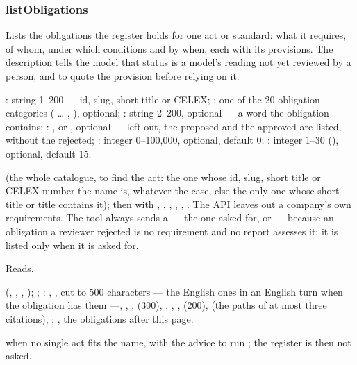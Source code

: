 \subsubsection{listObligations}\label{sec:tools:listObligations}
\begin{description}[style=multiline, leftmargin=19mm, labelwidth=17mm, labelsep=2mm,
  font=\sffamily\bfseries\footnotesize\color{ink}, itemsep=1pt, topsep=2pt, before=\raggedright]
  \item[Does] Lists the obligations the register holds for one act or standard: what it
    requires, of whom, under which conditions and by when, each with its provisions. The
    description tells the model that status  is a model's reading not yet
    reviewed by a person, and to quote the provision before relying on it.
  \item[Input] : string 1--200 --- id, slug, short title or CELEX; :
    one of the 20 obligation categories ( … ,
    ), optional; : string 2--200, optional --- a word the obligation
    contains; : ,  or , optional ---
    left out, the proposed and the approved are listed, without the rejected; :
    integer 0--100,000, optional, default 0; : integer
    1--30 (), optional, default 15.
  \item[Calls]  (the whole catalogue, to find the act:
    the one whose id, slug, short title or CELEX number the name is, whatever the case, else
    the only one whose short title or title contains it); then  with ,
    , , , , . The API leaves out a
    company's own requirements. The tool always sends a  --- the one asked for, or
     --- because an obligation a reviewer rejected is no requirement and
    no report assesses it: it is listed only when it is asked for.
  \item[Kind] Reads.
  \item[Returns]  (, , , );
    ; : , ,  cut to 500
    characters --- the English ones in an English turn when the obligation has them ---,
    , ,  (300), ,
    , ,  (200),  (the
    paths of at most three citations), ; , the obligations after this
    page.
  \item[Errors]  when no single act fits the name, with the advice to run
    ; the register is then not asked.
\end{description}


